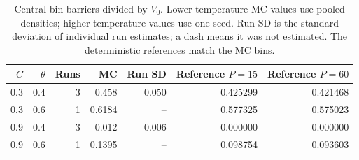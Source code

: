 \begin{table}[H]
\centering\small
\begin{tabular}{rrrrrrr}
\toprule
$C$ & $\theta$ & Runs & MC & Run SD & Reference $P=15$ & Reference $P=60$\\
\midrule
0.3 & 0.4 & 3 & 0.458 & 0.050 & 0.425299 & 0.421468 \\
0.3 & 0.6 & 1 & 0.6184 & -- & 0.577325 & 0.575023 \\
0.9 & 0.4 & 3 & 0.012 & 0.006 & 0.000000 & 0.000000 \\
0.9 & 0.6 & 1 & 0.1395 & -- & 0.098754 & 0.093603 \\
\bottomrule
\end{tabular}
\caption{Central-bin barriers divided by $V_0$. Lower-temperature MC values use pooled densities; higher-temperature values use one seed. Run SD is the standard deviation of individual run estimates; a dash means it was not estimated. The deterministic references match the MC bins.}
\label{tab:barriers}
\end{table}
